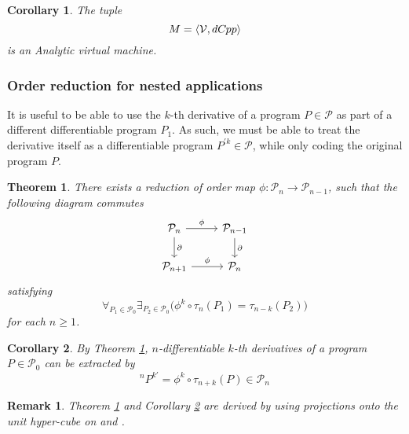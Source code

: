 \documentclass{article}
\newcommand{\VV}{\mathcal{V}}
\newcommand{\dP}{\mathcal{P}}
\newcommand{\D}{\partial}
\newcommand{\sumd}{\tau}
\newcommand{\dCpp}{dC\nolinebreak\hspace{-.05em}\raisebox{.4ex}{\tiny\bf +}\nolinebreak\hspace{-.10em}\raisebox{.4ex}{\tiny\bf p}}
\def\dCpp{{dC\nolinebreak[4]\hspace{-.05em}pp}}
\newtheorem{izrek}{Theorem}[section]
\newtheorem{opomba}{Remark}[section]
\newtheorem{corollary}{Corollary}[section]
\begin{document}
\begin{corollary}
The tuple 
\begin{equation}
M=\langle\VV,\dCpp\rangle
\end{equation}
is an Analytic virtual machine.
\end{corollary}

\subsubsection{Order reduction for nested applications}\label{sec:orderReduction}
 
 It is useful to be able to use the $k$-th derivative of a program $P\in\dP$ as part of a different differentiable program $P_1$. As such, we must be able to treat the derivative itself as a differentiable program $P^{\prime k}\in\dP$, while only coding the original program $P$. \cite[Section~5.3]{OperationalCalculus}
\begin{izrek}\label{izr:reductionMap}
There exists a reduction of order map $\phi:\dP_n\to \dP_{n-1}$, such that the
following  diagram commutes
\begin{equation}\label{eq:reductionMap}
\begin{tikzcd}
  \dP_n \arrow{r}{\phi} \arrow{d}{\D} & 
  \dP_{n-1} \arrow{d}{\D}\\
  \dP_{n+1} \arrow{r}{\phi} & 
  \dP_{n}
\end{tikzcd}
\end{equation}
satisfying
\begin{equation}
\forall_{P_1\in\dP_0}\exists_{P_2\in\dP_0}\Big(\phi^k\circ \sumd_n(P_1)=\sumd_{n-k}(P_2)\Big)
\end{equation}
for each $n\ge 1$.
\end{izrek}  
\begin{corollary}\label{cor:extraxtDerivatives}
By Theorem \ref{izr:reductionMap}, $n$-differentiable $k$-th derivatives of a program $P\in\dP_0$ can be extracted by
\begin{equation}
^{n}P^{k\prime}=\phi^k\circ \sumd_{n+k}(P)\in\dP_n
\end{equation}
\end{corollary}  
\begin{opomba}
Theorem \ref{izr:reductionMap} and Corollary \ref{cor:extraxtDerivatives} are derived by using projections onto the unit hyper-cube on \cite[Theorem~26]{OperationalCalculus} and \cite[Corollary~27]{OperationalCalculus}.
\end{opomba}  
\end{document}
